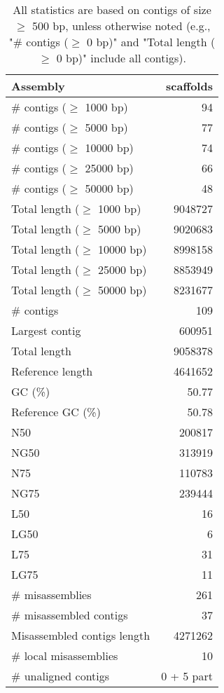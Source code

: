 \documentclass[12pt,a4paper]{article}
\begin{document}
\begin{table}[ht]
\begin{center}
\caption{All statistics are based on contigs of size $\geq$ 500 bp, unless otherwise noted (e.g., "\# contigs ($\geq$ 0 bp)" and "Total length ($\geq$ 0 bp)" include all contigs).}
\begin{tabular}{|l*{1}{|r}|}
\hline
Assembly & scaffolds \\ \hline
\# contigs ($\geq$ 1000 bp) & 94 \\ \hline
\# contigs ($\geq$ 5000 bp) & 77 \\ \hline
\# contigs ($\geq$ 10000 bp) & 74 \\ \hline
\# contigs ($\geq$ 25000 bp) & 66 \\ \hline
\# contigs ($\geq$ 50000 bp) & 48 \\ \hline
Total length ($\geq$ 1000 bp) & 9048727 \\ \hline
Total length ($\geq$ 5000 bp) & 9020683 \\ \hline
Total length ($\geq$ 10000 bp) & 8998158 \\ \hline
Total length ($\geq$ 25000 bp) & 8853949 \\ \hline
Total length ($\geq$ 50000 bp) & 8231677 \\ \hline
\# contigs & 109 \\ \hline
Largest contig & 600951 \\ \hline
Total length & 9058378 \\ \hline
Reference length & 4641652 \\ \hline
GC (\%) & 50.77 \\ \hline
Reference GC (\%) & 50.78 \\ \hline
N50 & 200817 \\ \hline
NG50 & 313919 \\ \hline
N75 & 110783 \\ \hline
NG75 & 239444 \\ \hline
L50 & 16 \\ \hline
LG50 & 6 \\ \hline
L75 & 31 \\ \hline
LG75 & 11 \\ \hline
\# misassemblies & 261 \\ \hline
\# misassembled contigs & 37 \\ \hline
Misassembled contigs length & 4271262 \\ \hline
\# local misassemblies & 10 \\ \hline
\# unaligned contigs & 0 + 5 part \\ \hline

\end{tabular}
\end{center}
\end{table}
\end{document}

